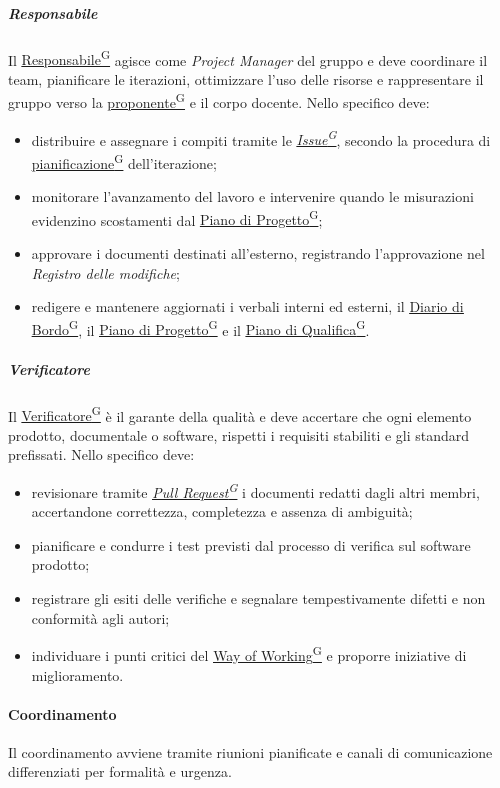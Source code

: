 \documentclass[a4paper,12pt]{article}
\providecommand{\glslink}[2]{\href{https://alittlebyte-19.github.io/Documentazione/glossario.html\#gls-#1}{\underline{#2}\textsuperscript{\scriptsize G}}}
\begin{document}
\subparagraph{Responsabile}
Il \glslink{responsabile}{Responsabile} agisce come \textit{Project Manager} del gruppo e deve coordinare il team, pianificare le iterazioni, ottimizzare l'uso delle risorse e rappresentare il gruppo verso la \glslink{committente-proponente}{proponente} e il corpo docente. Nello specifico deve:
\begin{itemize}
    \item distribuire e assegnare i compiti tramite le \textit{\glslink{issue}{Issue}}, secondo la procedura di \glslink{pianificazione}{pianificazione} dell'iterazione;
    \item monitorare l'avanzamento del lavoro e intervenire quando le misurazioni evidenzino scostamenti dal \glslink{piano-di-progetto}{Piano di Progetto};
    \item approvare i documenti destinati all'esterno, registrando l'approvazione nel \textit{Registro delle modifiche};
    \item redigere e mantenere aggiornati i verbali interni ed esterni, il \glslink{diario-di-bordo}{Diario di Bordo}, il \glslink{piano-di-progetto}{Piano di Progetto} e il \glslink{piano-di-qualifica}{Piano di Qualifica}.
\end{itemize}

\subparagraph{Verificatore}
Il \glslink{verificatore}{Verificatore} è il garante della qualità e deve accertare che ogni elemento prodotto, documentale o software, rispetti i requisiti stabiliti e gli standard prefissati. Nello specifico deve:
\begin{itemize}
    \item revisionare tramite \textit{\glslink{pull-request}{Pull Request}} i documenti redatti dagli altri membri, accertandone correttezza, completezza e assenza di ambiguità;
    \item pianificare e condurre i test previsti dal processo di verifica sul software prodotto;
    \item registrare gli esiti delle verifiche e segnalare tempestivamente difetti e non conformità agli autori;
    \item individuare i punti critici del \glslink{way-of-working-wow}{Way of Working} e proporre iniziative di miglioramento.
\end{itemize}

\paragraph{Coordinamento}
Il coordinamento avviene tramite riunioni pianificate e canali di comunicazione differenziati per formalità e urgenza.
\end{document}
